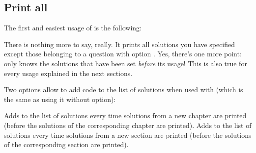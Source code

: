 \documentclass[load-preamble+]{cnltx-doc}
\begin{document}

\subsection{Print all}\label{sec:solutions-print-all}
The first and easiest usage of  is the following:
\begin{sourcecode}
  \printsolutions
\end{sourcecode}
There is nothing more to say, really. It prints all solutions you have
specified except those belonging to a question with option .
Yes, there's one more point:  only knows the solutions
that have been set \emph{before} its usage!  This is also true for every usage
explained in the next sections.

\begin{example}
  \printsolutions
\end{example}

Two options allow to add code to the list of solutions when used with
 (which is the same as using it without option):

\begin{options}
    Adds  to the list of solutions every time
    solutions from a new chapter are printed (before the solutions of the
    corresponding chapter are printed).
    Adds  to the list of solutions every time
    solutions from a new section are printed (before the solutions of the
    corresponding section are printed).
\end{options}
\end{document}

